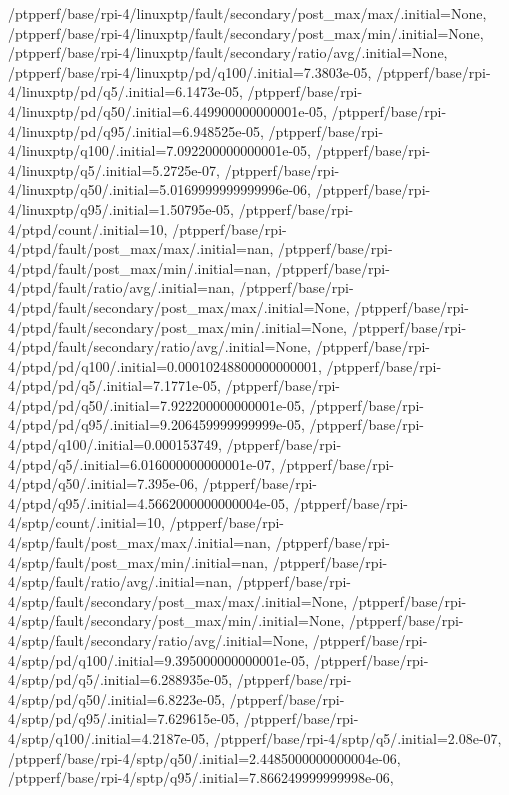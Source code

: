 {    /ptpperf/base/rpi-4/linuxptp/fault/secondary/post_max/max/.initial=None,
    /ptpperf/base/rpi-4/linuxptp/fault/secondary/post_max/min/.initial=None,
    /ptpperf/base/rpi-4/linuxptp/fault/secondary/ratio/avg/.initial=None,
    /ptpperf/base/rpi-4/linuxptp/pd/q100/.initial=7.3803e-05,
    /ptpperf/base/rpi-4/linuxptp/pd/q5/.initial=6.1473e-05,
    /ptpperf/base/rpi-4/linuxptp/pd/q50/.initial=6.449900000000001e-05,
    /ptpperf/base/rpi-4/linuxptp/pd/q95/.initial=6.948525e-05,
    /ptpperf/base/rpi-4/linuxptp/q100/.initial=7.092200000000001e-05,
    /ptpperf/base/rpi-4/linuxptp/q5/.initial=5.2725e-07,
    /ptpperf/base/rpi-4/linuxptp/q50/.initial=5.0169999999999996e-06,
    /ptpperf/base/rpi-4/linuxptp/q95/.initial=1.50795e-05,
    /ptpperf/base/rpi-4/ptpd/count/.initial=10,
    /ptpperf/base/rpi-4/ptpd/fault/post_max/max/.initial=nan,
    /ptpperf/base/rpi-4/ptpd/fault/post_max/min/.initial=nan,
    /ptpperf/base/rpi-4/ptpd/fault/ratio/avg/.initial=nan,
    /ptpperf/base/rpi-4/ptpd/fault/secondary/post_max/max/.initial=None,
    /ptpperf/base/rpi-4/ptpd/fault/secondary/post_max/min/.initial=None,
    /ptpperf/base/rpi-4/ptpd/fault/secondary/ratio/avg/.initial=None,
    /ptpperf/base/rpi-4/ptpd/pd/q100/.initial=0.00010248800000000001,
    /ptpperf/base/rpi-4/ptpd/pd/q5/.initial=7.1771e-05,
    /ptpperf/base/rpi-4/ptpd/pd/q50/.initial=7.922200000000001e-05,
    /ptpperf/base/rpi-4/ptpd/pd/q95/.initial=9.206459999999999e-05,
    /ptpperf/base/rpi-4/ptpd/q100/.initial=0.000153749,
    /ptpperf/base/rpi-4/ptpd/q5/.initial=6.016000000000001e-07,
    /ptpperf/base/rpi-4/ptpd/q50/.initial=7.395e-06,
    /ptpperf/base/rpi-4/ptpd/q95/.initial=4.5662000000000004e-05,
    /ptpperf/base/rpi-4/sptp/count/.initial=10,
    /ptpperf/base/rpi-4/sptp/fault/post_max/max/.initial=nan,
    /ptpperf/base/rpi-4/sptp/fault/post_max/min/.initial=nan,
    /ptpperf/base/rpi-4/sptp/fault/ratio/avg/.initial=nan,
    /ptpperf/base/rpi-4/sptp/fault/secondary/post_max/max/.initial=None,
    /ptpperf/base/rpi-4/sptp/fault/secondary/post_max/min/.initial=None,
    /ptpperf/base/rpi-4/sptp/fault/secondary/ratio/avg/.initial=None,
    /ptpperf/base/rpi-4/sptp/pd/q100/.initial=9.395000000000001e-05,
    /ptpperf/base/rpi-4/sptp/pd/q5/.initial=6.288935e-05,
    /ptpperf/base/rpi-4/sptp/pd/q50/.initial=6.8223e-05,
    /ptpperf/base/rpi-4/sptp/pd/q95/.initial=7.629615e-05,
    /ptpperf/base/rpi-4/sptp/q100/.initial=4.2187e-05,
    /ptpperf/base/rpi-4/sptp/q5/.initial=2.08e-07,
    /ptpperf/base/rpi-4/sptp/q50/.initial=2.4485000000000004e-06,
    /ptpperf/base/rpi-4/sptp/q95/.initial=7.866249999999998e-06,
}
